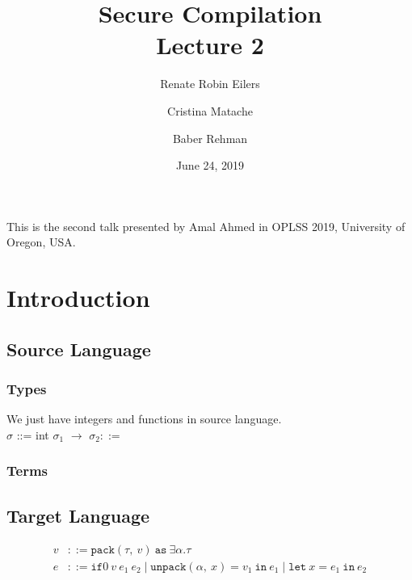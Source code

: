 \documentclass{article}
\title{Secure Compilation \\ \Large{Lecture 2}}
\author{Renate Robin Eilers  \and Cristina Matache \and Baber Rehman}
\date{June 24, 2019}
\newcommand{\pack}[4]{\texttt{pack}(#1,\ #2)\ \texttt{as}\ \exists#3.#4}
\newcommand{\unpack}[4]{\texttt{unpack}(#1,\ #2)=#3\ \texttt{in}\ #4}
\newcommand{\letin}[3]{\texttt{let}\ #1=#2\ \texttt{in}\ #3}
\newcommand{\ifzero}[3]{\texttt{if}0\ #1\ #2\ #3}
\begin{document}
\maketitle

This is the second talk presented by Amal Ahmed in OPLSS 2019, University of Oregon, USA.

\section{Introduction}

\subsection{Source Language}

\subsubsection{Types}

We just have integers and functions in source language. \\

$\sigma$ ::= int \textbar \hspace{0.1cm} $\sigma_1$ $\rightarrow$ $\sigma_2 ::= $

\subsubsection{Terms}

\subsection{Target Language}

\begin{align*}
  v &::= \pack{\tau}{v}{\alpha}{\tau} \\
  e &::= \ifzero{v}{e_1}{e_2} \mid \unpack{\alpha}{x}{v_1}{e_1} \mid \letin{x}{e_1}{e_2}
\end{align*}
\end{document}
